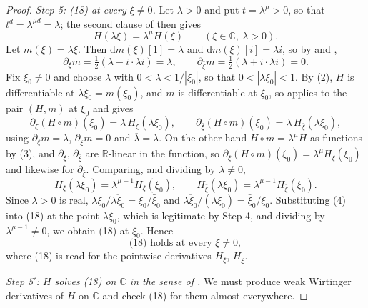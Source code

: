 \begin{proof}
\emph{Step 5: (18) at every $\xi\neq0$.}  Let $\lambda>0$ and put
$t=\lambda^{\mu}>0$, so that $t^{d}=\lambda^{\mu d}=\lambda$; the second clause
of  then gives
\begin{equation}\tag{3}
  H(\lambda\xi)=\lambda^{\mu}H(\xi)\qquad(\xi\in\mathbb{C},\ \lambda>0).
\end{equation}
Let $m(\xi)=\lambda\xi$.  Then $\mathrm{d}m(\xi)[1]=\lambda$ and
$\mathrm{d}m(\xi)[i]=\lambda i$, so by  and ,
\[
  \partial_\xi m=\tfrac12(\lambda-i\cdot\lambda i)=\lambda,\qquad
  \partial_{\bar\xi}m=\tfrac12(\lambda+i\cdot\lambda i)=0 .
\]
Fix $\xi_0\neq0$ and choose $\lambda$ with $0<\lambda<1/|\xi_0|$, so that
$0<|\lambda\xi_0|<1$.  By (2), $H$ is differentiable at $\lambda\xi_0=m(\xi_0)$,
and $m$ is differentiable at $\xi_0$, so  applies
to the pair $(H,m)$ at $\xi_0$ and gives
\[
  \partial_\xi(H\circ m)(\xi_0)=\lambda\,H_\xi(\lambda\xi_0),\qquad
  \partial_{\bar\xi}(H\circ m)(\xi_0)=\lambda\,H_{\bar\xi}(\lambda\xi_0),
\]
using $\partial_\xi m=\lambda$, $\partial_{\bar\xi}m=0$ and
$\overline{\lambda}=\lambda$.  On the other hand $H\circ m=\lambda^{\mu}H$ as
functions by (3), and $\partial_\xi$, $\partial_{\bar\xi}$ are
$\mathbb{R}$-linear in the function, so
$\partial_\xi(H\circ m)(\xi_0)=\lambda^{\mu}H_\xi(\xi_0)$ and likewise for
$\partial_{\bar\xi}$.  Comparing, and dividing by $\lambda\neq0$,
\begin{equation}\tag{4}
  H_\xi(\lambda\xi_0)=\lambda^{\mu-1}H_\xi(\xi_0),\qquad
  H_{\bar\xi}(\lambda\xi_0)=\lambda^{\mu-1}H_{\bar\xi}(\xi_0).
\end{equation}
Since $\lambda>0$ is real, $\lambda\xi_0/\overline{\lambda\xi_0}=\xi_0/\bar\xi_0$
and $\overline{\lambda\xi_0}/(\lambda\xi_0)=\bar\xi_0/\xi_0$.  Substituting (4)
into (18) at the point $\lambda\xi_0$, which is legitimate by Step 4, and
dividing by $\lambda^{\mu-1}\neq0$, we obtain (18) at $\xi_0$.  Hence
\begin{equation}\tag{5}
  \text{(18) holds at every }\xi\neq0,
\end{equation}
where (18) is read for the pointwise derivatives $H_\xi$, $H_{\bar\xi}$.

\emph{Step 5$'$: $H$ solves (18) on $\mathbb{C}$ in the sense of
.}  We must produce weak Wirtinger derivatives of $H$ on
$\mathbb{C}$ and check (18) for them almost everywhere.


\end{proof}
